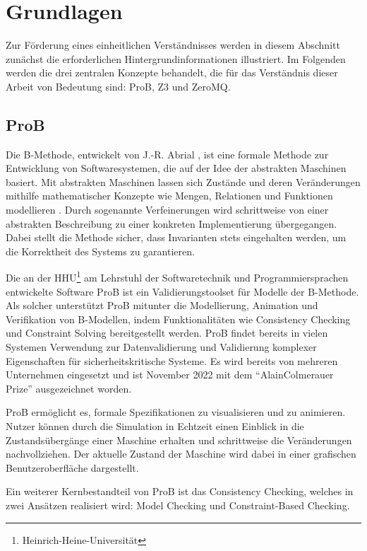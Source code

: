 
\section{Grundlagen}

Zur Förderung eines einheitlichen Verständnisses werden in diesem Abschnitt zunächst die erforderlichen Hintergrundinformationen illustriert.
Im Folgenden werden die drei zentralen Konzepte behandelt, die für das Verständnis dieser Arbeit von Bedeutung sind: ProB, Z3 und ZeroMQ.

\subsection{ProB}

Die B-Methode, entwickelt von J.-R. Abrial \cite{abrial1996b}, ist eine formale Methode zur Entwicklung von Softwaresystemen,
die auf der Idee der abstrakten Maschinen basiert.
Mit abstrakten Maschinen lassen sich Zustände und deren Veränderungen mithilfe mathematischer Konzepte wie Mengen,
Relationen und Funktionen modellieren \cite{leuschel2003prob}.
Durch sogenannte Verfeinerungen wird schrittweise von einer abstrakten Beschreibung zu einer konkreten Implementierung übergegangen.
Dabei stellt die Methode sicher, dass Invarianten stets eingehalten werden,
um die Korrektheit des Systems zu garantieren.

Die an der HHU\footnote{Heinrich-Heine-Universität} am Lehrstuhl der Softwaretechnik und Programmiersprachen entwickelte Software ProB \cite{leuschel2003prob} ist ein Validierungstoolset für Modelle der B-Methode.
Als solcher unterstützt ProB mitunter die Modellierung, Animation und Verifikation von B-Modellen,
indem Funktionalitäten wie Consistency Checking und Constraint Solving bereitgestellt werden.
ProB findet bereits in vielen Systemen Verwendung zur Datenvalidierung und Validierung komplexer Eigenschaften für sicherheitskritische Systeme.
Es wird bereits von mehreren Unternehmen eingesetzt und ist November 2022 mit dem \enquote{AlainColmerauer Prize} ausgezeichnet worden.

ProB ermöglicht es, formale Spezifikationen zu visualisieren und zu animieren.
Nutzer können durch die Simulation in Echtzeit einen Einblick in die Zustandsübergänge einer Maschine erhalten und schrittweise die Veränderungen nachvollziehen.
Der aktuelle Zustand der Maschine wird dabei in einer grafischen Benutzeroberfläche dargestellt.

Ein weiterer Kernbestandteil von ProB ist das Consistency Checking, welches in zwei Ansätzen realisiert wird: Model Checking und Constraint-Based Checking.

